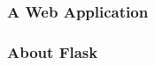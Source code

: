 \begin{frame}
  \frametitle{A Web Application}
\end{frame}

\begin{frame}
  \frametitle{About Flask}
\end{frame}
